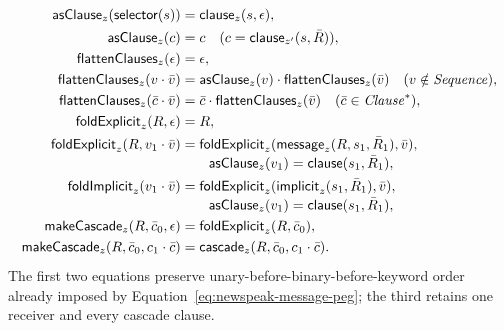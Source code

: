\begin{equation}\label{eq:surface-message-folds}
\begin{aligned}
 \mathsf{asClause}_{z}(\mathsf{selector}(s))&=\mathsf{clause}_{z}(s,\epsilon),\\
 \mathsf{asClause}_{z}(c)&=c
   \quad(c=\mathsf{clause}_{z'}(s,\bar R)),\\
 \mathsf{flattenClauses}_{z}(\epsilon)&=\epsilon,\\
 \mathsf{flattenClauses}_{z}(v\cdot\bar v)&=
   \mathsf{asClause}_{z}(v)\cdot\mathsf{flattenClauses}_{z}(\bar v)
   \quad(v\notin\mathit{Sequence}),\\
 \mathsf{flattenClauses}_{z}(\bar c\cdot\bar v)&=
   \bar c\cdot\mathsf{flattenClauses}_{z}(\bar v)
   \quad(\bar c\in\mathit{Clause}^{*}),\\
 \mathsf{foldExplicit}_{z}(R,\epsilon)&=R,\\
 \mathsf{foldExplicit}_{z}(R,v_1\cdot\bar v)&=
   \mathsf{foldExplicit}_{z}
     (\mathsf{message}_{z}(R,s_1,\bar R_1),\bar v),\\[-1mm]
 &\qquad\mathsf{asClause}_{z}(v_1)=\mathsf{clause}(s_1,\bar R_1),\\
 \mathsf{foldImplicit}_{z}(v_1\cdot\bar v)&=
   \mathsf{foldExplicit}_{z}
     (\mathsf{implicit}_{z}(s_1,\bar R_1),\bar v),\\[-1mm]
 &\qquad\mathsf{asClause}_{z}(v_1)=\mathsf{clause}(s_1,\bar R_1),\\
 \mathsf{makeCascade}_{z}(R,\bar c_0,\epsilon)&=
   \mathsf{foldExplicit}_{z}(R,\bar c_0),\\
 \mathsf{makeCascade}_{z}(R,\bar c_0,c_1\cdot\bar c)&=
   \mathsf{cascade}_{z}(R,\bar c_0,c_1\cdot\bar c).
\end{aligned}
\end{equation}
The first two equations preserve unary-before-binary-before-keyword order
already imposed by Equation~\eqref{eq:newspeak-message-peg}; the third retains
one receiver and every cascade clause.

